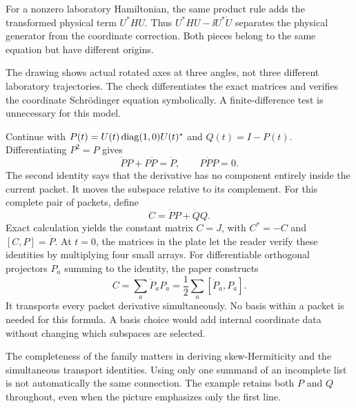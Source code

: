 For a nonzero laboratory Hamiltonian, the same product rule adds the transformed physical term $U^*HU$. Thus $U^*HU-\ii U^*\dot U$ separates the physical generator from the coordinate correction. Both pieces belong to the same equation but have different origins.

The drawing shows actual rotated axes at three angles, not three different laboratory trajectories. The check differentiates the exact matrices and verifies the coordinate Schr\"odinger equation symbolically. A finite-difference test is unnecessary for this model.

Continue with $P(t)=U(t)\operatorname{diag}(1,0)U(t)^*$ and $Q(t)=I-P(t)$. Differentiating $P^2=P$ gives
\[
\dot P P+P\dot P=\dot P,
\qquad P\dot P P=0.
\]
The second identity says that the derivative has no component entirely inside the current packet. It moves the subspace relative to its complement.
For this complete pair of packets, define
\[
C=\dot P P+\dot Q Q.
\]
Exact calculation yields the constant matrix $C=J$, with $C^*=-C$ and $[C,P]=\dot P$. At $t=0$, the matrices in the plate let the reader verify these identities by multiplying four small arrays.
For differentiable orthogonal projectors $P_a$ summing to the identity, the paper constructs
\[
C=\sum_a\dot P_aP_a=\frac12\sum_a[\dot P_a,P_a].
\]
It transports every packet derivative simultaneously. No basis within a packet is needed for this formula. A basis choice would add internal coordinate data without changing which subspaces are selected.

The completeness of the family matters in deriving skew-Hermiticity and the simultaneous transport identities. Using only one summand of an incomplete list is not automatically the same connection. The example retains both $P$ and $Q$ throughout, even when the picture emphasizes only the first line.

